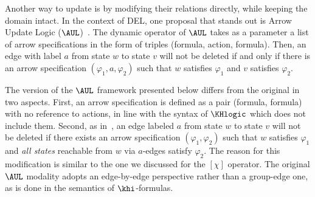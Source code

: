 Another way to update \ltss is by modifying their relations directly, while keeping the domain intact. In the context of DEL, one proposal that stands out is Arrow Update Logic ($\AUL$)~\cite{KooiR11}. The dynamic operator of $\AUL$ takes as a parameter a list of arrow specifications in the form of triples (formula, action, formula). Then, an edge with label $a$ from state $w$ to state $v$ will not be deleted if and only if there is an arrow specification $(\varphi_1, a, \varphi_2)$ such that $w$ satisfies $\varphi_1$ and $v$ satisfies $\varphi_2$. 

The version of the $\AUL$ framework presented below differs from the original in two aspects. First, an arrow specification is defined as a pair (formula, formula) with no reference to actions, in line with the syntax of $\KHlogic$ which does not include them. 
Second, as in~, an edge labeled $a$ from state $w$ to state $v$ will not be deleted if there exists an arrow specification $(\varphi_1, \varphi_2)$ such that $w$ satisfies $\varphi_1$ and \emph{all states} reachable from $w$ via $a$-edges satisfy $\varphi_2$. The reason for this modification is similar to the one we discussed for the $[\chi]$ operator. The original $\AUL$ modality adopts an edge-by-edge perspective rather than a group-edge one, as is done in the semantics of $\khi$-formulas.




